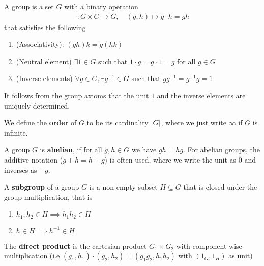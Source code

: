 \begin{dfn}[Basics]
A group is a set $G$ with a binary operation 
\begin{align*}
  \cdot: G \times G \to G, \quad (g,h) \mapsto g \cdot h = gh
\end{align*}
that satisfies the following
\begin{enumerate}
  \item (Associativity): $(gh)k = g(hk)$
  \item (Neutral element) $\exists 1 \in G$ such that $1 \cdot g = g \cdot 1 = g$ for all $g \in G$
  \item (Inverse elements) $\forall g \in G, \exists g^{-1} \in G$ such that $gg^{-1} = g^{-1}g = 1$
\end{enumerate}
It follows from the group axioms that the unit $1$ and the inverse elements are uniquely determined.

We define the \textbf{order} of $G$ to be its cardinality $\vert G\vert$, where we just write $\infty$ if $G$ is infinite.

A group $G$ is \textbf{abelian}, if for all $g,h \in G$ we have $gh = hg$. 
For abelian groups, the additive notation ($g + h = h + g$) is often used, where we write the unit as $0$ and inverses as $-g$.

A \textbf{subgroup} of a group $G$ is a non-empty subset $H \subseteq G$ that is closed under the group multiplication, that is
\begin{enumerate}
  \item $h_1,h_2 \in H \implies h_1h_2 \in H$
  \item $h \in H \implies h^{-1} \in H$
\end{enumerate}

The \textbf{direct product} is the cartesian product $G_1 \times G_2$ with component-wise multiplication (i.e $(g_1,h_1) \cdot (g_2,h_2) = (g_1g_2,h_1h_2)$ with $(1_G,1_H)$ as unit)
\end{dfn}

